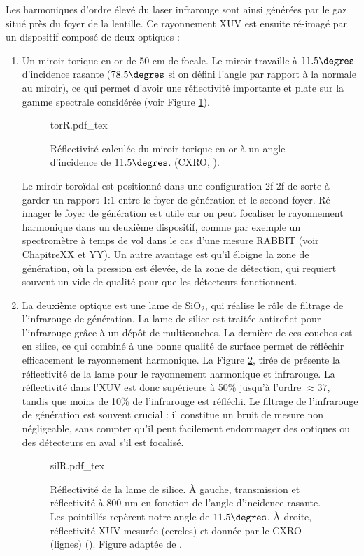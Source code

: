 Les harmoniques d'ordre élevé du laser infrarouge sont ainsi générées par le gaz situé près du foyer de la lentille. Ce rayonnement XUV est ensuite ré-imagé par un dispositif composé de deux optiques :
\begin{enumerate}
\item Un miroir torique en or de 50 cm de focale. Le miroir travaille à $11.5\degres$ d'incidence rasante ($78.5\degres$ si on défini l'angle par rapport à la normale au miroir), ce qui permet d'avoir une réflectivité importante et plate sur la gamme spectrale considérée (voir Figure \ref{Fig:TorR}).

\begin{figure}[!ht]
\centering
\def\svgwidth{0.6\columnwidth}
{torR.pdf_tex}
\caption{Réflectivité calculée du miroir torique en or à un angle d'incidence de $11.5\degres$. (CXRO, ).}
\label{Fig:TorR}
\end{figure}

Le miroir toroïdal est positionné dans une configuration 2f-2f de sorte à garder un rapport 1:1 entre le foyer de génération et le second foyer. Ré-imager le foyer de génération est utile car on peut focaliser le rayonnement harmonique dans un deuxième dispositif, comme par exemple un spectromètre à temps de vol dans le cas d'une mesure RABBIT (voir ChapitreXX et YY). Un autre avantage est qu'il éloigne la zone de génération, où la pression est élevée, de la zone de détection, qui requiert souvent un vide de qualité pour que les détecteurs fonctionnent.

\item La deuxième optique est une lame de Si$\mbox{O}_{\mbox{2}}$, qui réalise le rôle de filtrage de l'infrarouge de génération. La lame de silice est traitée antireflet pour l'infrarouge grâce à un dépôt de multicouches. La dernière de ces couches est en silice, ce qui combiné à une bonne qualité de surface permet de réfléchir efficacement le rayonnement harmonique. La Figure \ref{Fig:SilR}, tirée de  présente la réflectivité de la lame pour le rayonnement harmonique et infrarouge. La réflectivité dans l'XUV est donc supérieure à 50\% jusqu'à l'ordre $\approx 37$, tandis que moins de 10\% de l'infrarouge est réfléchi. Le filtrage de l'infrarouge de génération est souvent crucial : il constitue un bruit de mesure non négligeable, sans compter qu'il peut facilement endommager des optiques ou des détecteurs en aval s'il est focalisé.

\begin{figure}[!ht]
\centering
\def\svgwidth{\columnwidth}
{silR.pdf_tex}
\caption{Réflectivité de la lame de silice. \`{A} gauche, transmission et réflectivité à 800 nm en fonction de l'angle d'incidence rasante. Les pointillés repèrent notre angle de $11.5\degres$. \`{A} droite, réflectivité XUV mesurée (cercles) et donnée par le CXRO (lignes) (). Figure adaptée de .}
\label{Fig:SilR}
\end{figure}
\end{enumerate}

